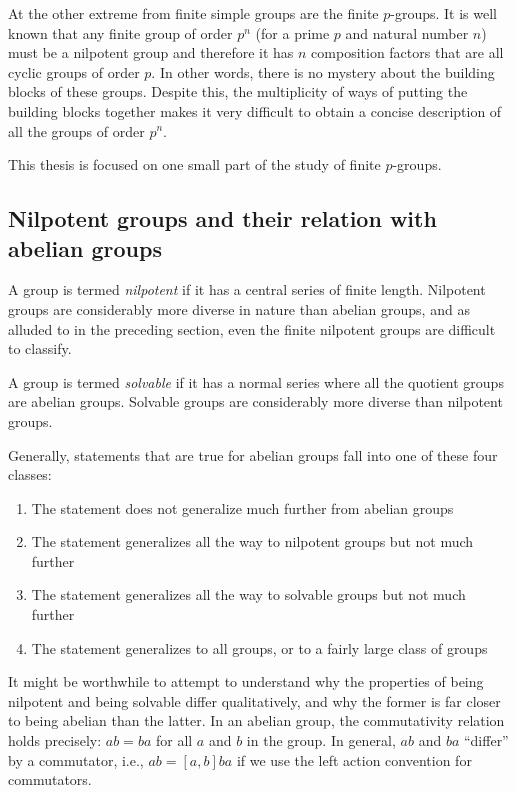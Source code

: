 \documentclass{ucetd}
\begin{document}
At the other extreme from finite simple groups are the finite
$p$-groups. It is well known that any finite group of order $p^n$ (for
a prime $p$ and natural number $n$) must be a nilpotent group and
therefore it has $n$ composition factors that are all cyclic groups of
order $p$. In other words, there is no mystery about the building
blocks of these groups. Despite this, the multiplicity of ways of
putting the building blocks together makes it very difficult to obtain
a concise description of all the groups of order $p^n$.

This thesis is focused on one small part of the study of finite
$p$-groups.

\subsection{Nilpotent groups and their relation with abelian groups}

A group is termed {\em nilpotent} if it has a central series of finite
length. Nilpotent groups are considerably more diverse in nature than
abelian groups, and as alluded to in the preceding section, even the
finite nilpotent groups are difficult to classify.

A group is termed {\em solvable} if it has a normal series where all
the quotient groups are abelian groups. Solvable groups are
considerably more diverse than nilpotent groups.

Generally, statements that are true for abelian groups fall into one
of these four classes:

\begin{enumerate}
\item The statement does not generalize much further from abelian
  groups
\item The statement generalizes all the way to nilpotent groups but
  not much further
\item The statement generalizes all the way to solvable groups but not
  much further
\item The statement generalizes to all groups, or to a fairly large
  class of groups
\end{enumerate}

It might be worthwhile to attempt to understand why the properties of
being nilpotent and being solvable differ qualitatively, and why the
former is far closer to being abelian than the latter. In an abelian
group, the commutativity relation holds precisely: $ab = ba$ for all
$a$ and $b$ in the group. In general, $ab$ and $ba$ ``differ'' by a
commutator, i.e., $ab = [a,b]ba$ if we use the left action convention
for commutators.
\end{document}

